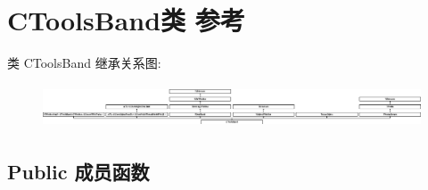 \hypertarget{class_c_tools_band}{}\section{C\+Tools\+Band类 参考}
\label{class_c_tools_band}
类 C\+Tools\+Band 继承关系图\+:\begin{figure}[H]
\begin{center}
\leavevmode
\includegraphics[height=1.296296cm]{class_c_tools_band}
\end{center}
\end{figure}
\subsection*{Public 成员函数}
